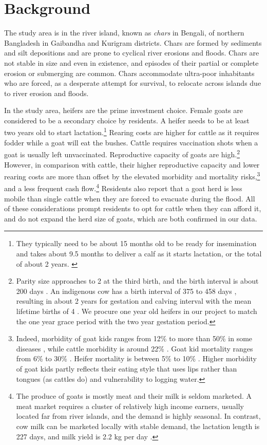 \section{Background}
\label{SecBackground}


	The study area is in the river island, known as \textit{chars} in Bengali, of northern Bangladesh in Gaibandha and Kurigram districts. Chars are formed by sediments and silt depositions and are prone to cyclical river erosions and floods. Chars are not stable in size and even in existence, and episodes of their partial or complete erosion or submerging are common. Chars accommodate ultra-poor inhabitants who are forced, as a desperate attempt for survival, to relocate across islands due to river erosion and floods.

	In the study area, heifers are the prime investment choice. Female goats are considered to be a secondary choice by residents. A heifer needs to be at least two years old to start lactation.\footnote{They typically need to be about 15 months old to be ready for insemination and takes about 9.5 months to deliver a calf as it starts lactation, or the total of about 2 years. \label{heifer2years}} Rearing costs are higher for cattle as it requires fodder while a goat will eat the bushes. Cattle requires vaccination shots when a goat is usually left unvaccinated. Reproductive capacity of goats are high.\footnote{Parity size approaches to 2 at the third birth, and the birth interval is about 200 days \citep{Hasan2014goat}. An indigenous cow has a birth interval of 375 to 458 days \citep{Hasan2018}, resulting in about 2 years for gestation and calving interval \citep{Habib2012} with the mean lifetime births of 4 \citep[][Table 1]{Hasan2018}. We procure one year old heifers in our project to match the one year grace period with the two year gestation period. } However, in comparison with cattle, their higher reproductive capacity and lower rearing costs are more than offset by the elevated morbidity and mortality risks,\footnote{Indeed, morbidity of goat kids ranges from 12\% \citep{Mahmud2015} to more than 50\% in some diseases \citep[][Table 5]{Nandi2011}, while cattle morbidity is around 22\% \citep{Bangar2013}. Goat kid mortality ranges from 6\% \citep{Mahmud2015} to 30\% \citep[][Table 5]{Paul2014} \citep{Ershaduzzaman2007}. Heifer mortality is between 5\% \citep[][p.332R]{Hossain2014} to 10\% \citep{Alauddin2018}. Higher morbidity of goat kids partly reflects their eating style that uses lips rather than tongues (as cattles do) and vulnerability to logging water. } and a less frequent cash flow.\footnote{The produce of goats is mostly meat and their milk is seldom marketed. A meat market requires a cluster of relatively high income earners, usually located far from river islands, and the demand is highly seasonal. In contrast, cow milk can be marketed locally with stable demand, the lactation length is 227 days, and milk yield is 2.2 kg per day \citep{Rokonuzzaman2009}. } Residents also report that a goat herd is less mobile than single cattle when they are forced to evacuate during the flood. All of these considerations prompt residents to opt for cattle when they can afford it, and do not expand the herd size of goats, which are both confirmed in our data.

